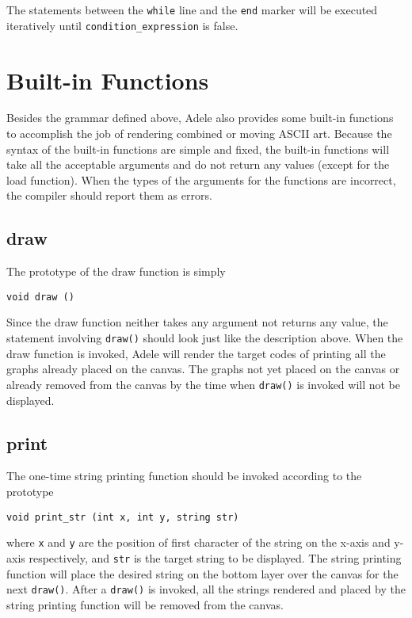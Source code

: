 \documentclass[11pt,letterpaper]{article}
\begin{document}
The statements between the \texttt{while} line and the \texttt{end} marker will be executed iteratively until \texttt{condition\_expression} is false.

\section {Built-in Functions}
Besides the grammar defined above, Adele also provides some built-in functions to accomplish the job of rendering combined or moving ASCII art. Because the syntax of the built-in functions are simple and fixed, the built-in functions will take all the acceptable arguments and do not return any values (except for the load function). When the types of the arguments for the functions are incorrect, the compiler should report them as errors.

\subsection {draw}
The prototype of the draw function is simply
\begin{lstlisting}[tabsize=4]
	void draw ()
\end{lstlisting}
Since the draw function neither takes any argument not returns any value, the statement involving \texttt{draw()} should look just like the description above. When the draw function is invoked, Adele will render the target codes of printing all the graphs already placed on the canvas. The graphs not yet placed on the canvas or already removed from the canvas by the time when \texttt{draw()} is invoked will not be displayed.

\subsection {print}
The one-time string printing function should be invoked according to the prototype
\begin{lstlisting}[tabsize=4]
	void print_str (int x, int y, string str)
\end{lstlisting}
where \texttt{x} and \texttt{y} are the position of first character of the string on the x-axis and y-axis respectively, and \texttt{str} is the target string to be displayed. The string printing function will place the desired string on the bottom layer over the canvas for the next \texttt{draw()}. After a \texttt{draw()} is invoked, all the strings rendered and placed by the string printing function will be removed from the canvas.
\end{document}
